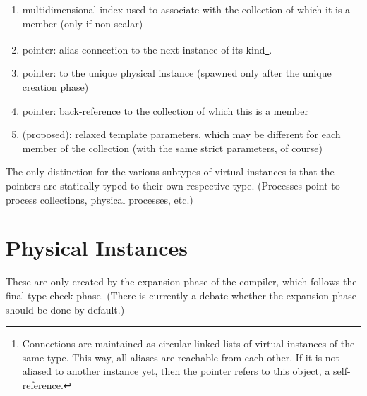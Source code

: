 \begin{enumerate}
\item multidimensional index used to associate with the collection
	of which it is a member (only if non-scalar)
\item pointer: alias connection to the next instance
	of its kind\footnote{Connections are maintained 
	as circular linked lists of virtual instances of the same type.  
	This way, all aliases are reachable from each other.
	If it is not aliased to another instance yet, 
	then the pointer refers to this object, a self-reference.}.
\item pointer: to the unique physical instance 
	(spawned only after the unique creation phase)
\item pointer: back-reference to the collection of which this is a member
\item (proposed): relaxed template parameters, 
	which may be different for each member of the collection
	(with the same strict parameters, of course)
\end{enumerate}

The only distinction for the various subtypes of virtual instances is that
the pointers are statically typed to their own respective type.
(Processes point to process collections, physical processes, etc.)

\begin{comment}
\subsection{Process VI}
\label{sec:instance:virtual:proc}

\subsection{Channel VI}
\label{sec:instance:virtual:chan}

\subsection{Data VI}
\label{sec:instance:virtual:data}
\end{comment}

\section{Physical Instances}
\label{sec:instance:physical}

These are only created by the expansion phase of the compiler, 
which follows the final type-check phase.  
(There is currently a debate whether the expansion phase should
be done by default.)  


